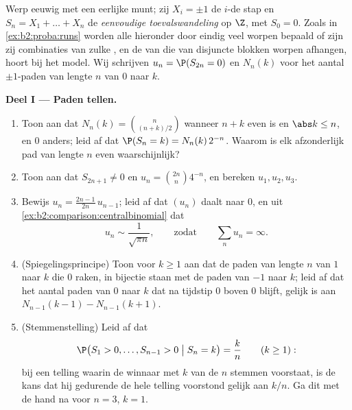 \begin{problem}\label{pb:b2:proba:1}
Werp eeuwig met een eerlijke munt; zij $X_i = \pm1$ de $i$-de stap
en $S_n = X_1 + \dots + X_n$ de \emph{eenvoudige
toevalswandeling} op $\Z$, met $S_0 = 0$.
Zoals in \cref{ex:b2:proba:runs} worden alle 
hieronder door eindig veel worpen bepaald of zijn zij 
combinaties van zulke , en de  van
 die van disjuncte blokken worpen afhangen, hoort bij
het model. Wij schrijven $u_n = \P(S_{2n} = 0)$ en $N_n(k)$ voor
het aantal $\pm1$-paden van lengte $n$ van $0$ naar $k$.

\medskip
\noindent\textbf{Deel I --- Paden tellen.}
\begin{enumerate}
  \item Toon aan dat $N_n(k) = \binom{n}{(n+k)/2}$ wanneer $n + k$
        even is en $\abs k \leq n$, en $0$ anders; leid af dat
        $\P(S_n = k) = N_n(k)\,2^{-n}$. Waarom is elk afzonderlijk
        pad van lengte $n$ even waarschijnlijk?
  \item Toon aan dat $S_{2n+1} \neq 0$ en $u_n =
        \binom{2n}{n}4^{-n}$, en bereken $u_1, u_2, u_3$.
  \item Bewijs $u_n = \frac{2n-1}{2n}\,u_{n-1}$; leid af dat
        $(u_n)$ daalt naar $0$, en uit
        \cref{ex:b2:comparison:centralbinomial} dat
        \[
        u_n \sim \frac{1}{\sqrt{\pi n}},
        \qquad\text{zodat}\qquad
        \sum_n u_n = \infty .
        \]
  \item (Spiegelingsprincipe) Toon voor $k \geq 1$ aan dat de paden
        van lengte $n$ van $1$ naar $k$ die $0$ raken, in bijectie
        staan met de paden van $-1$ naar $k$; leid af dat het
        aantal paden van $0$ naar $k$ dat na tijdstip $0$ boven $0$
        blijft, gelijk is aan $N_{n-1}(k-1) - N_{n-1}(k+1)$.
  \item (Stemmenstelling) Leid af dat
        \[
        \P\bigl(S_1 > 0, \dots, S_{n-1} > 0 \bigm| S_n =
        k\bigr) = \frac kn \qquad (k \geq 1) :
        \]
        bij een telling waarin de winnaar met $k$ van de $n$
        stemmen voorstaat, is de kans dat hij gedurende de hele
        telling voorstond gelijk aan $k/n$. Ga dit met de hand na
        voor $n = 3$, $k = 1$.
\end{enumerate}


\end{problem}
